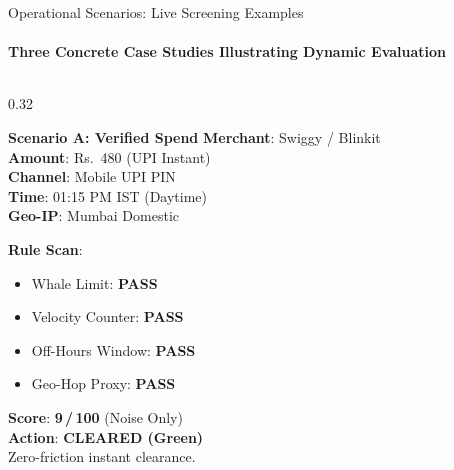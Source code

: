 \documentclass[aspectratio=169,10pt]{beamer}
\begin{document}
\begin{frame}{Operational Scenarios: Live Screening Examples}
  \framesubtitle{Three Concrete Case Studies Illustrating Dynamic Evaluation}
  \begin{columns}[t]
    \begin{column}{0.32\textwidth}
      \begin{exampleblock}{\textbf{Scenario A: Verified Spend}}
        \scriptsize
        \textbf{Merchant}: Swiggy / Blinkit\\
        \textbf{Amount}: Rs.~480 (UPI Instant)\\
        \textbf{Channel}: Mobile UPI PIN\\
        \textbf{Time}: 01:15 PM IST (Daytime)\\
        \textbf{Geo-IP}: Mumbai Domestic\\
        \par\vspace{0.2em}\dotfill\par

        \textbf{Rule Scan}:
        \begin{itemize}
          \tiny
          \item Whale Limit: \textcolor{statusGreen}{\textbf{PASS}}
          \item Velocity Counter: \textcolor{statusGreen}{\textbf{PASS}}
          \item Off-Hours Window: \textcolor{statusGreen}{\textbf{PASS}}
          \item Geo-Hop Proxy: \textcolor{statusGreen}{\textbf{PASS}}
        \end{itemize}
        \par\vspace{0.2em}\dotfill\par

        \textbf{Score}: \textbf{9\,/\,100} (Noise Only)\\
        \textbf{Action}: \textcolor{statusGreen}{\textbf{CLEARED (Green)}}\\[1pt]
        \tiny Zero-friction instant clearance.
      \end{exampleblock}
    \end{column}


\end{columns}
\end{frame}
\end{document}
